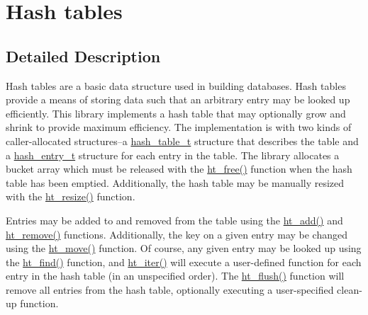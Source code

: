\hypertarget{group__dbprim__hash}{
\section{Hash tables}
\label{group__dbprim__hash}
}


\subsection{Detailed Description}
Hash tables are a basic data structure used in building databases. Hash tables provide a means of storing data such that an arbitrary entry may be looked up efficiently. This library implements a hash table that may optionally grow and shrink to provide maximum efficiency. The implementation is with two kinds of caller-allocated structures--a \hyperlink{group__dbprim__hash_a0}{hash\_\-table\_\-t} structure that describes the table and a \hyperlink{group__dbprim__hash_a1}{hash\_\-entry\_\-t} structure for each entry in the table. The library allocates a bucket array which must be released with the \hyperlink{group__dbprim__hash_a14}{ht\_\-free()} function when the hash table has been emptied. Additionally, the hash table may be manually resized with the \hyperlink{group__dbprim__hash_a13}{ht\_\-resize()} function.

Entries may be added to and removed from the table using the \hyperlink{group__dbprim__hash_a7}{ht\_\-add()} and \hyperlink{group__dbprim__hash_a9}{ht\_\-remove()} functions. Additionally, the key on a given entry may be changed using the \hyperlink{group__dbprim__hash_a8}{ht\_\-move()} function. Of course, any given entry may be looked up using the \hyperlink{group__dbprim__hash_a10}{ht\_\-find()} function, and \hyperlink{group__dbprim__hash_a11}{ht\_\-iter()} will execute a user-defined function for each entry in the hash table (in an unspecified order). The \hyperlink{group__dbprim__hash_a12}{ht\_\-flush()} function will remove all entries from the hash table, optionally executing a user-specified clean-up function. 

